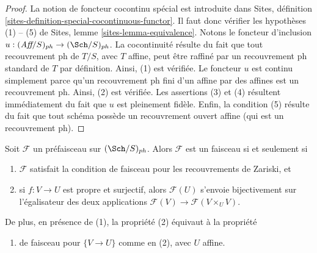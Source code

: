 \begin{proof}
La notion de foncteur cocontinu spécial est introduite dans
Sites, définition \ref{sites-definition-special-cocontinuous-functor}.
Il faut donc vérifier les hypothèses (1) -- (5) de
Sites, lemme \ref{sites-lemma-equivalence}.
Notons le foncteur d'inclusion
$u : (\textit{Aff}/S)_{ph} \to (\Sch/S)_{ph}$.
La cocontinuité résulte du fait que tout recouvrement ph de
$T/S$, avec $T$ affine, peut être raffiné par un recouvrement ph standard de $T$
par définition. Ainsi, (1) est vérifiée. Le foncteur $u$ est continu simplement
parce qu'un recouvrement ph fini d'un affine par des affines est un recouvrement ph.
Ainsi, (2) est vérifiée.
Les assertions (3) et (4) résultent immédiatement du fait que $u$ est
pleinement fidèle. Enfin, la condition (5) résulte du
fait que tout schéma possède un recouvrement ouvert affine (qui est
un recouvrement ph).
\end{proof}

\begin{lemma}
\label{lemma-characterize-sheaf}
Soit $\mathcal{F}$ un préfaisceau sur $(\Sch/S)_{ph}$.
Alors $\mathcal{F}$ est un faisceau si et seulement si
\begin{enumerate}
\item $\mathcal{F}$ satisfait la condition de faisceau pour les
recouvrements de Zariski, et
\item si $f : V \to U$ est propre et surjectif, alors
$\mathcal{F}(U)$ s'envoie bijectivement sur l'égalisateur
des deux applications $\mathcal{F}(V) \to \mathcal{F}(V \times_U V)$.
\end{enumerate}
De plus, en présence de (1), la propriété (2) équivaut à la propriété
\begin{enumerate}
\item[(2')] de faisceau pour $\{V \to U\}$ comme en (2), avec $U$ affine.
\end{enumerate}
\end{lemma}

